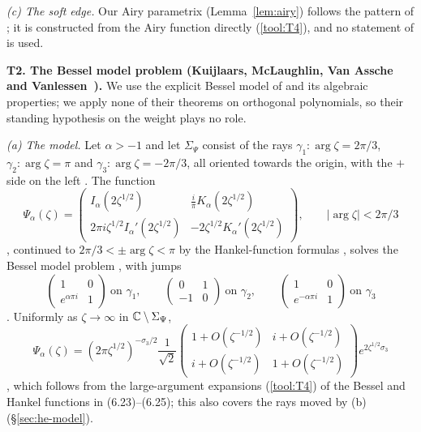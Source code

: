 \emph{(c) The soft edge.} Our Airy parametrix (Lemma~\ref{lem:airy}) follows the pattern of \cite[\S6.1,
(6.4), (6.10)--(6.12)]{WLXZ}; it is constructed from the Airy function directly (\ref{tool:T4}), and no statement of
\cite{WLXZ} is used.

\medskip
\noindent\textbf{T2. The Bessel model problem (Kuijlaars, McLaughlin, Van Assche and Vanlessen~\cite{KMVV}).}%
We use the explicit Bessel model of \cite[\S6]{KMVV} and its algebraic properties; we apply none of their theorems on
orthogonal polynomials, so their standing hypothesis on the weight \cite[(1.1)]{KMVV} plays no role.

\emph{(a) The model.} Let $\alpha>-1$ and let $\Sigma_\Psi$ consist of the rays $\gamma_1:\arg\zeta=2\pi/3$,
$\gamma_2:\arg\zeta=\pi$ and $\gamma_3:\arg\zeta=-2\pi/3$, all oriented towards the origin, with the $+$ side on the
left \cite[Figure~3]{KMVV}. The function
\[
  \Psi_\alpha(\zeta)=\begin{pmatrix}I_\alpha(2\zeta^{1/2}) & \frac i\pi K_\alpha(2\zeta^{1/2})\\[1mm]
  2\pi i\zeta^{1/2}I_\alpha'(2\zeta^{1/2}) & -2\zeta^{1/2}K_\alpha'(2\zeta^{1/2})\end{pmatrix},\qquad|\arg\zeta|<2\pi/3
\]
\cite[(6.23)]{KMVV}, continued to $2\pi/3<\pm\arg\zeta<\pi$ by the Hankel-function formulas \cite[(6.24)--(6.25)]{KMVV},
solves the Bessel model problem \cite[Theorem~6.3]{KMVV}, with jumps
\[
  \begin{pmatrix}1&0\\e^{\alpha\pi i}&1\end{pmatrix}\ \text{on }\gamma_1,\qquad
  \begin{pmatrix}0&1\\-1&0\end{pmatrix}\ \text{on }\gamma_2,\qquad
  \begin{pmatrix}1&0\\e^{-\alpha\pi i}&1\end{pmatrix}\ \text{on }\gamma_3
\]
\cite[(6.16)--(6.18)]{KMVV}. Uniformly as $\zeta\to\infty$ in $\mathbb{C}\setminus\Sigma_\Psi$,
\[
  \Psi_\alpha(\zeta)=(2\pi\zeta^{1/2})^{-\sigma_3/2}\frac1{\sqrt2}
  \begin{pmatrix}1+O(\zeta^{-1/2})&i+O(\zeta^{-1/2})\\ i+O(\zeta^{-1/2})&1+O(\zeta^{-1/2})\end{pmatrix}e^{2\zeta^{1/2}\sigma_3}
\]
\cite[(6.28)]{KMVV}, which follows from the large-argument expansions (\ref{tool:T4}) of the Bessel and Hankel
functions in (6.23)--(6.25); this also covers the rays moved by (b) (\S\ref{sec:he-model}).

